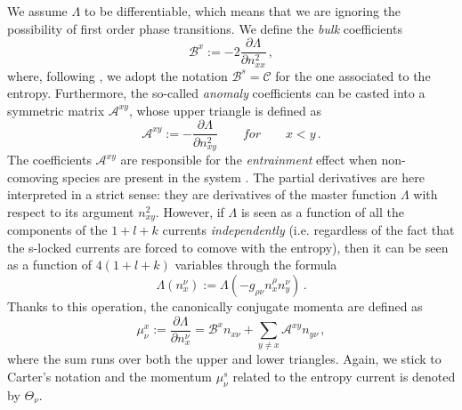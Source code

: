\documentclass[usenatbib]{mnras}
\begin{document}
We assume $\Lambda$ to be differentiable, which means that we are ignoring the possibility of first order phase transitions. We define the \textit{bulk} coefficients 
%
\begin{equation}
\label{bcoeff}
\mathcal{B}^x := -2 \dfrac{\partial \Lambda}{\partial n_{xx}^2} \, ,
\end{equation} 
%
where, following \cite{carter92}, we adopt the notation $\mathcal{B}^s=\mathcal{C}$ for the one associated to the entropy. Furthermore, the so-called \textit{anomaly} coefficients can be casted into a symmetric matrix 
$\mathcal{A}^{xy}$, whose upper triangle is defined as
%
\begin{equation}
\label{anomaly1}
\mathcal{A}^{xy}:= -\dfrac{\partial \Lambda}{\partial n^2_{xy}} 
\qquad for  \qquad
x < y \,.
\end{equation}
%
%
The coefficients $\mathcal{A}^{xy}$ are responsible for the \emph{entrainment} effect when non-comoving species are present in the system \citep[][]{khala57,andreevbashkin1976}. 
The partial derivatives are here interpreted in a strict sense: they are derivatives of the master function $\Lambda$ with respect to its argument $n_{xy}^2$. 
However, if $\Lambda$  is seen as a function of all the components of the $1+l+k$ currents \emph{independently} (i.e. regardless of the fact that the s-locked currents are forced to comove with the entropy), then it can be seen as a function of $4(1+l+k)$ variables through the formula 
%
\begin{equation}
\Lambda (n_{x}^\nu) := \Lambda(-g_{\rho \nu} n_x^\rho n_y^\nu) \, .
\end{equation}
%
Thanks to this operation, the canonically conjugate momenta are defined as
%
\begin{equation}
\label{noivinciamosempre}
\mu_{\nu}^x
:= 
\dfrac{\partial \Lambda}{\partial n_x^\nu} 
= 
\mathcal{B}^x n_{x\nu} + \sum_{y \neq x} \mathcal{A}^{xy}n_{y\nu} \, , 
\end{equation}
%
where the sum runs over both the upper and lower triangles.
Again, we stick to Carter's notation and the momentum $\mu_{\nu}^s$ related to the entropy current is denoted by $\Theta_\nu$.
\end{document}
